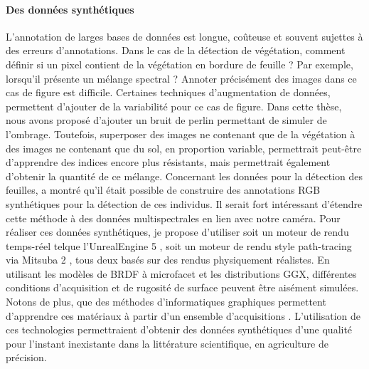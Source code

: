 \documentclass[../thesis.tex]{subfiles}
\begin{document}
    \paragraph{Des données synthétiques} L'annotation de larges bases de données est longue, coûteuse et souvent sujettes à des erreurs d'annotations. Dans le cas de la détection de végétation, comment définir si un pixel contient de la végétation en bordure de feuille ? Par exemple, lorsqu'il présente un mélange spectral ? Annoter précisément des images dans ce cas de figure est difficile. Certaines techniques d'augmentation de données, permettent d'ajouter de la variabilité pour ce cas de figure. Dans cette thèse, nous avons proposé d'ajouter un bruit de perlin permettant de simuler de l'ombrage. Toutefois, superposer des images ne contenant que de la végétation à des images ne contenant que du sol, en proportion variable, permettrait peut-être d'apprendre des indices encore plus résistants, mais permettrait également d'obtenir la quantité de ce mélange. Concernant les données pour la détection des feuilles, \cite{Ward2018DeepLS} a montré qu'il était possible de construire des annotations RGB synthétiques pour la détection de ces individus. Il serait fort intéressant d'étendre cette méthode à des données multispectrales en lien avec notre caméra. Pour réaliser ces données synthétiques, je propose d'utiliser soit un moteur de rendu temps-réel telque l'UnrealEngine 5 \cite{qiu2016unrealcv}, soit un moteur de rendu style path-tracing via Mitsuba 2 \cite{NimierDavidVicini2019Mitsuba2}, tous deux basés sur des rendus physiquement réalistes. En utilisant les modèles de BRDF à microfacet et les distributions GGX, différentes conditions d'acquisition et de rugosité de surface peuvent être aisément simulées. Notons de plus, que des méthodes d'informatiques graphiques permettent d'apprendre ces matériaux à partir d'un ensemble d'acquisitions \cite{dupuy2015extracting}. L'utilisation de ces technologies permettraient d'obtenir des données synthétiques d'une qualité pour l'instant inexistante dans la littérature scientifique, en agriculture de précision.
    
    \newpage
\end{document}
